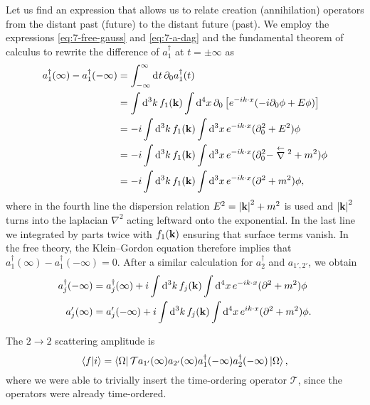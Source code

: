 Let us find an expression that allows us to relate creation (annihilation) operators from the distant past (future) to the distant future (past).
We employ the expressions \eqref{eq:7-free-gauss} and \eqref{eq:7-a-dag} and the fundamental theorem of calculus to rewrite the difference of $a_1^{\dagger}$ at $t = \pm \infty$ as
\begin{align}
  a_1^{\dagger}(\infty) - a_1^{\dagger}(-\infty) &= \int_{-\infty}^{\infty}\dd[]{t} \partial_0 a_1^{\dagger} (t) \\
					   &= \int \dd[3]{k} f_1(\vb{k}) \int \dd[4]{x} \partial_0 \left[ e^{-i k \cdot x} (-i \partial_0 \phi + E \phi) \right] \\
					   &= -i \int \dd[3]{k} f_1(\vb{k}) \int \dd[3]{x} e^{-i k \cdot x} (\partial_0^2 + E^2) \phi \\
					   &= -i \int \dd[3]{k} f_1(\vb{k}) \int \dd[3]{x} e^{-i k \cdot x} (\partial_0^2 - \stackrel{\leftarrow}{\nabla}{}^2 + m^2) \phi \\
					   &= -i \int \dd[3]{k} f_1(\vb{k}) \int \dd[3]{x} e^{-i k \cdot x} (\partial^2 + m^2) \phi,
\end{align}
where in the fourth line the dispersion relation $E^2 = \abs{\vb{k}}^2 + m^2$ is used and $\abs{\vb{k}}^2$ turns into the laplacian $\nabla^2$ acting leftward onto the exponential. In the last line we integrated by parts twice with $f_1(\vb{k})$ ensuring that surface terms vanish.
In the free theory, the Klein--Gordon equation therefore implies that $a_1^{\dagger}(\infty) - a_1^{\dagger}(-\infty) = 0$.
After a similar calculation for $a^{\dagger}_2$ and $a_{1', 2'}$, we obtain
\begin{subequations}
  \label{eq:7-creations}
   \begin{align}
     a_j^{\dagger}(-\infty) &= a_j^{\dagger}(\infty) + i \int \dd[3]{k} f_j(\vb{k}) \int \dd[4]{x} e^{-i k \cdot x} (\partial^2 + m^2) \phi \\
     a_j'(\infty) &= a_j'(-\infty) + i \int \dd[3]{k} f_j(\vb{k}) \int \dd[4]{x} e^{i k \cdot x} (\partial^2 + m^2) \phi.
  \end{align}
\end{subequations}

The $2 \to 2$ scattering amplitude is
\begin{equation}
  \label{eq:7-amp}
  \bra{f}\ket{i} = \bra{\Omega} \mathcal{T} a_{1'}(\infty) a_{2'}(\infty)a_{1}^{\dagger}(-\infty) a_2^{\dagger}(-\infty) \ket{\Omega},
\end{equation}
where we were able to trivially insert the time-ordering operator $\mathcal{T}$, since the operators were already time-ordered.

